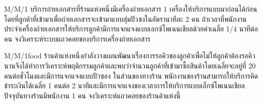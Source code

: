 \newpage
\begin{example}
	{M/M/1}{}
	บริการถ่ายเอกสารที่ร้านแห่งหนึ่งมีเครื่องถ่ายเอกสาร 1 เครื่องให้บริการแบบมาก่อนได้ก่อน โดยที่ลูกค้าที่เข้ามาเพื่อถ่ายเอกสารจะเข้ามาแบบสุ่มปัวซงในอัตรานาทีละ 2 คน ถ้าเวลาที่พนักงานประจำเครื่องถ่ายเอกสารให้บริการลูกค้ามีการแจกแจงแบบเอกซ์โพเนนเชียลด้วยค่าเฉลี่ย 1/4 นาทีต่อคน
	จงวิเคราะห์ระบบแถวคอยของบริการเครื่องถ่ายเอกสาร
\end{example}
\newpage
%	
\begin{example}
	{M/M/1}{food}
	ร้านค้าแห่งหนึ่งกำลังวางแผนพัฒนาเรื่องการรอคิวของลูกค้าเพื่อไม่ให้ลูกค้าต้องรอคิวนานจึงได้ทำการวิเคราะห์พฤติกรรมลูกค้าและพบว่าจำนวนลูกค้าที่เข้ามาซื้อสินค้าโดยเฉลี่ยจะอยู่ที่ 20 คนต่อชั่วโมงและมีการแจกแจงแบบปัวซอง ในส่วนของทางร้าน พนักงานของร้านสามารถให้บริการคิดชำระเงินได้เฉลี่ย 1 คนต่อ 2 นาทีและมีการแจกแจงของเวลาการให้บริการแบบเอ็กซ์โพเนนเชียล ปัจจุบันทางร้านมีพนักงาน 1 คน จงวิเคราะห์แถวคอยของร้านค้าแห่งนี้ 
\end{example}
\newpage

